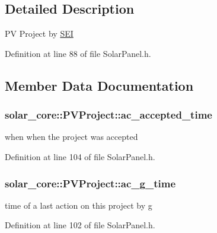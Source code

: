 \subsection{Detailed Description}
P\+V Project by \hyperlink{classsolar__core_1_1_s_e_i}{S\+E\+I} 

Definition at line 88 of file Solar\+Panel.\+h.



\subsection{Member Data Documentation}
\hypertarget{classsolar__core_1_1_p_v_project_a1affdb487e749b689fe2bcbd9c79613c}{}
\subsubsection[{ac\+\_\+accepted\+\_\+time}]{ solar\+\_\+core\+::\+P\+V\+Project\+::ac\+\_\+accepted\+\_\+time}\label{classsolar__core_1_1_p_v_project_a1affdb487e749b689fe2bcbd9c79613c}
when when the project was accepted 

Definition at line 104 of file Solar\+Panel.\+h.

\hypertarget{classsolar__core_1_1_p_v_project_a9be23309024672b4be445f68c73e42a6}{}
\subsubsection[{ac\+\_\+g\+\_\+time}]{ solar\+\_\+core\+::\+P\+V\+Project\+::ac\+\_\+g\+\_\+time}\label{classsolar__core_1_1_p_v_project_a9be23309024672b4be445f68c73e42a6}
time of a last action on this project by g 

Definition at line 102 of file Solar\+Panel.\+h.

\hypertarget{classsolar__core_1_1_p_v_project_ab6196935ca6f777b28a944642efdbf84}{}
